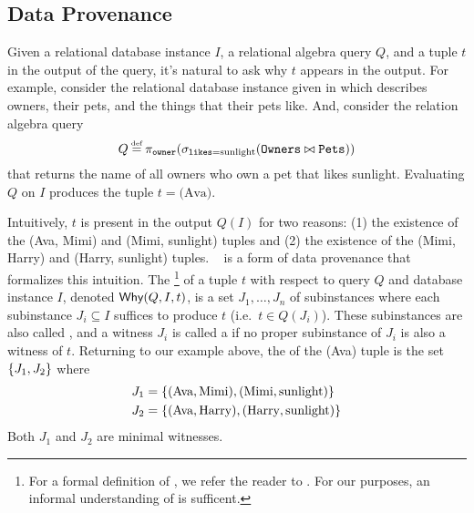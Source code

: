 \subsection{Data Provenance}
Given a relational database instance $I$, a relational algebra query $Q$, and a
tuple $t$ in the output of the query, it's natural to ask why $t$ appears in
the output. For example, consider the relational database instance given in
 which describes owners, their pets, and the things that
their pets like. And, consider the relation algebra query
\[
  Q \defeq \pi_{\ttt{owner}}(
             \sigma_{\ttt{likes} = \text{sunlight}}(
               \ttt{Owners} \join \ttt{Pets}
             )
           )
\]
that returns the name of all owners who own a pet that likes sunlight.
Evaluating $Q$ on $I$ produces the tuple $t = \text{(Ava)}$.

{}

Intuitively, $t$ is present in the output $Q(I)$ for two reasons: (1) the
existence of the (Ava, Mimi) and (Mimi, sunlight) tuples and (2) the existence
of the (Mimi, Harry) and (Harry, sunlight) tuples.
~\cite{buneman2001and, cheney2009provenance} is a
form of data provenance that formalizes this intuition. The
\whyprovenance{}\footnote{
  For a formal definition of \whyprovenance{}, we refer the reader to
  \cite{cheney2009provenance}. For our purposes, an informal understanding of
  \whyprovenance{} is sufficent.
}
of a tuple $t$ with respect to query $Q$ and database instance $I$, denoted
$\textsf{Why}(Q, I, t)$, is a set $J_1, \ldots, J_n$ of subinstances where each
subinstance $J_i \subseteq I$ suffices to produce $t$ (i.e.\ $t \in Q(J_i)$).
These subinstances are also called , and a witness
$J_i$ is called a  if no proper subinstance of
$J_i$ is also a witness of $t$.
%
Returning to our example above, the \whyprovenance{} of the (Ava) tuple is the
set $\{J_1, J_2\}$ where
\begin{align*}
  J_1 &= \{(\text{Ava}, \text{Mimi}), (\text{Mimi}, \text{sunlight})\} \\
  J_2 &= \{(\text{Ava}, \text{Harry}), (\text{Harry}, \text{sunlight})\}
\end{align*}
Both $J_1$ and $J_2$ are minimal witnesses.

